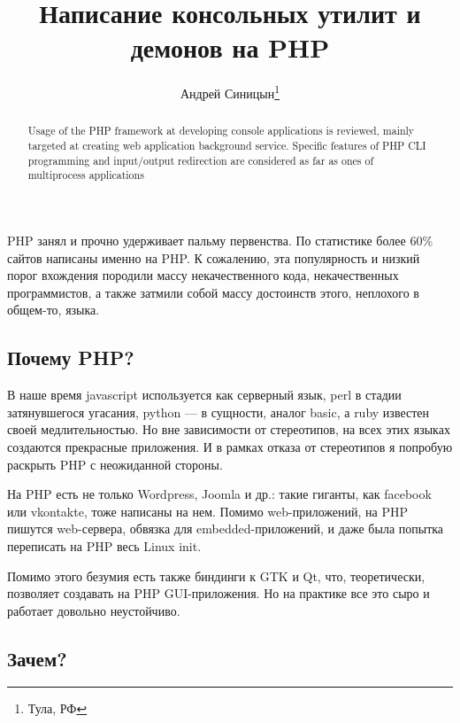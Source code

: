 \documentclass[10pt, a5paper]{article}
\begin{document}
\title{Написание консольных утилит и демонов на PHP}%

\author{Андрей Синицын\footnote{Тула, РФ}}
\maketitle

\begin{abstract}
Usage of the PHP framework at developing console applications is reviewed, mainly targeted at creating web application \linebreak background service. Specific features of PHP CLI programming and input/output redirection are considered as far as ones of multiprocess applications
\end{abstract}

PHP занял и прочно удерживает пальму первенства. По статистике более 60\% сайтов написаны именно на PHP. К сожалению, эта популярность и низкий порог вхождения породили массу некачественного кода, некачественных программистов, а также затмили собой массу достоинств этого, неплохого в общем-то, языка.

\subsection*{Почему PHP?}

В наше время javascript используется как серверный язык, perl в стадии затянувшегося угасания, python — в сущности, аналог basic, а ruby известен своей медлительностью. Но вне зависимости от стереотипов, на всех этих языках создаются прекрасные приложения. И в рамках отказа от стереотипов я попробую раскрыть PHP с неожиданной стороны.

На PHP есть не только Wordpress, Joomla и др.: такие гиганты, как facebook или vkontakte, тоже написаны на нем. Помимо web-приложений, на PHP пишутся web-сервера, обвязка для embedded-приложений, и даже была попытка переписать на PHP весь Linux init.

Помимо этого безумия есть также биндинги к GTK и Qt, что, теоретически, позволяет создавать на PHP GUI-приложения. Но на практике все это сыро и работает довольно неустойчиво.

\subsection*{Зачем?}
\end{document}
